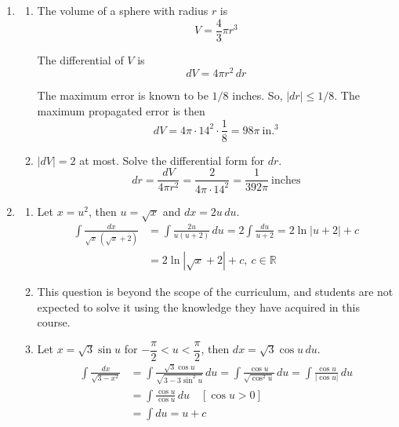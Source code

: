 \documentclass[a4paper, 12pt]{article}
\renewcommand{\headrulewidth}{0pt}
\renewcommand{\headrulewidth}{0pt}
\begin{document}
\newpage
{}
{}

\newpage
\pagestyle{fancy}
\renewcommand{\headrulewidth}{1pt}


\begin{enumerate}[leftmargin=*,label=\textbf{\arabic*.}]
\item
\begin{enumerate}[leftmargin=*,label=\textbf{\alph*.}]
\item The volume of a sphere with radius $r$ is
\[V=\frac43\pi r^3\]

The differential of $V$ is
\[dV=4\pi r^2\,dr\]

The maximum error is known to be $1/8$ inches. So, $|dr|\leq1/8$. The maximum propagated error is then
\[dV=4\pi\cdot14^2\cdot\dfrac18=\boxed{98\pi\:\text{in.}^3}\]

\item $|dV|=2$ at most. Solve the differential form for $dr$.
\[dr=\frac{dV}{4\pi r^2}=\frac{2}{4\pi\cdot 14^2}=\boxed{\frac1{392\pi}\:\text{inches}}\]
\end{enumerate}

\item
\begin{enumerate}[leftmargin=*,label=\textbf{\alph*.}]
\item Let $x=u^2$, then $u=\sqrt x$ and $dx=2u\,du$.
\begin{align*}\int\frac{dx}{\sqrt x\,\left(\sqrt x+2\right)}&=\int\frac{2u}{u(u+2)}\,du=2\int\frac{du}{u+2}=2\ln|u+2|+c\\[1em]&=\boxed{2\ln\left|\sqrt x+2\right|+c,\: c\in\mathbb{R}}\end{align*}

\item This question is beyond the scope of the curriculum, and students are not expected to solve it using the knowledge they have acquired in this course.

\item Let $x=\sqrt3\sin u$ for $-\dfrac\pi2<u<\dfrac\pi2$, then $dx=\sqrt3\cos u\,du$.
\begin{align*}\int\frac{dx}{\sqrt{3-x^2}}&=\int\frac{\sqrt3\cos u}{\sqrt{3-3\sin^2u}}\,du=\int\frac{\cos u}{\sqrt{\cos^2u}}\,du=\int\frac{\cos u}{|\cos u|}\,du\\[1em]&=\int\frac{\cos u}{\cos u}\,du\quad\left[\cos u>0\right]\\[1em]&=\int du=u+c\end{align*}


\end{enumerate}
\end{enumerate}
\end{document}
